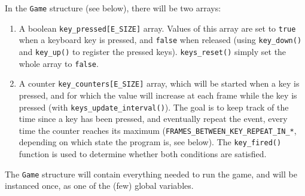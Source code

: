 \documentclass[12pt,a4paper]{article}
\newcommand{\cc}[1]{\texttt{#1}}
\begin{document}
In the \cc{Game} structure (see below), there will be two arrays:\begin{enumerate}
\item A boolean \cc{key_pressed[E_SIZE]} array. Values of this array are set to \cc{true} when a keyboard key is pressed, and \cc{false} when released (using \cc {key_down()} and \cc{key_up()} to register the pressed keys). \cc{keys_reset()} simply set the whole array to \cc{false}.
\item A counter \cc{key_counters[E_SIZE]} array, which will be started when a key is pressed, and for which the value will increase at each frame while the key is pressed (with \cc{keys_update_interval()}). The goal is to keep track of the time since a key has been pressed, and eventually repeat the event, every time the counter reaches its maximum (\cc{FRAMES_BETWEEN_KEY_REPEAT_IN_*}, depending on which state the program is, see below). The \cc{key_fired()} function is used to determine whether both conditions are satisfied.
\end{enumerate}

The \cc{Game} structure will contain everything needed to run the game, and will be instanced once, as one of the (few) global variables.
\end{document}
